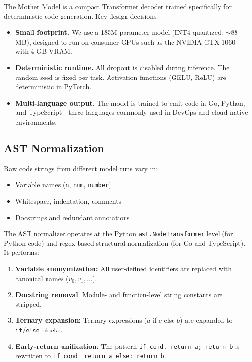 \documentclass[11pt,a4paper]{article}
\begin{document}
The Mother Model is a compact Transformer decoder trained specifically
for deterministic code generation. Key design decisions:

\begin{itemize}
    \item \textbf{Small footprint.} We use a 185M-parameter model (INT4
          quantized: $\sim$88 MB), designed to run on consumer GPUs
          such as the NVIDIA GTX 1060 with 4 GB VRAM.
    \item \textbf{Deterministic runtime.} All dropout is disabled during
          inference. The random seed is fixed per task. Activation
          functions (GELU, ReLU) are deterministic in PyTorch.
    \item \textbf{Multi-language output.} The model is trained to emit
          code in Go, Python, and TypeScript---three languages commonly
          used in DevOps and cloud-native environments.
\end{itemize}

\subsection{AST Normalization}

Raw code strings from different model runs vary in:
\begin{itemize}
    \item Variable names (\texttt{n}, \texttt{num}, \texttt{number})
    \item Whitespace, indentation, comments
    \item Docstrings and redundant annotations
\end{itemize}

The AST normalizer operates at the Python \texttt{ast.NodeTransformer}
level (for Python code) and regex-based structural normalization (for
Go and TypeScript). It performs:

\begin{enumerate}
    \item \textbf{Variable anonymization:} All user-defined identifiers
          are replaced with canonical names ($v_0, v_1, \ldots$).
    \item \textbf{Docstring removal:} Module- and function-level string
          constants are stripped.
    \item \textbf{Ternary expansion:} Ternary expressions ($a$ if $c$
          else $b$) are expanded to \texttt{if}/\texttt{else} blocks.
    \item \textbf{Early-return unification:} The pattern
          \texttt{if cond: return a; return b} is rewritten to
          \texttt{if cond: return a else: return b}.
\end{enumerate}
\end{document}
